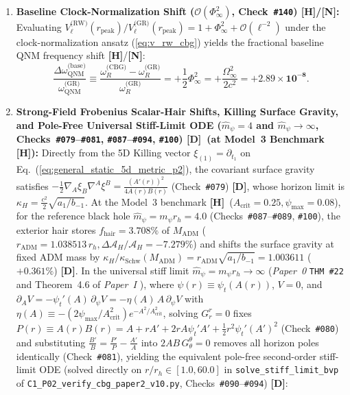 \documentclass[11pt,a4paper]{article}
\newcommand{\catD}{\textbf{\textcolor{blue!75!black}{[D]}}}
\newcommand{\catH}{\textbf{\textcolor{orange!85!black}{[H]}}}
\newcommand{\catN}{\textbf{\textcolor{teal!75!black}{[N]}}}
\theoremstyle{plain}
\theoremstyle{definition}
\theoremstyle{remark}
\numberwithin{equation}{section}
\begin{document}
\begin{enumerate}
    \item \textbf{Baseline Clock-Normalization Shift ($\mathcal{O}(\Phi_{\infty}^2)$, Check~\texttt{\#140}) \catH/\catN:} Evaluating $V_{\ell}^{\text{(RW)}}(r_{\text{peak}})/V_{\ell}^{\text{(GR)}}(r_{\text{peak}}) = 1 + \Phi_{\infty}^2 + \mathcal{O}(\ell^{-2})$ under the clock-normalization ansatz (\ref{eq:v_rw_cbg}) yields the fractional baseline QNM frequency shift \catH/\catN:
    \begin{equation}
    \frac{\Delta \omega_{\text{QNM}}^{\text{(base)}}}{\omega_{\text{QNM}}^{\text{(GR)}}} \equiv \frac{\omega_{R}^{\text{(CBG)}} - \omega_{R}^{\text{(GR)}}}{\omega_{R}^{\text{(GR)}}} = +\frac{1}{2}\Phi_{\infty}^2 = +\frac{\Omega_{\infty}^2}{2 c^2} = \mathbf{+2.89 \times 10^{-8}}.
    \label{eq:universal_qnm_shift}
    \end{equation}
    \item \textbf{Strong-Field Frobenius Scalar-Hair Shifts, Killing Surface Gravity, and Pole-Free Universal Stiff-Limit ODE ($\hat{m}_{\psi} = 4$ and $\hat{m}_{\psi} \to \infty$, Checks~\texttt{\#079}--\texttt{\#081}, \texttt{\#087}--\texttt{\#094}, \texttt{\#100}) \catD\ (at Model~3 Benchmark \catH):} Directly from the 5D Killing vector $\xi_{(1)} = \partial_{t_1}$ on Eq.~(\ref{eq:general_static_5d_metric_p2}), the covariant surface gravity satisfies $-\frac{1}{2}\nabla_A\xi_B\nabla^A\xi^B = \frac{(A'(r))^2}{4 A(r)B(r)}$ (Check~\texttt{\#079}) \catD, whose horizon limit is $\kappa_H = \frac{c^2}{2}\sqrt{a_1/b_{-1}}$. At the Model~3 benchmark \catH\ ($A_{\text{crit}} = 0.25, \psi_{\max} = 0.08$), for the reference black hole $\hat{m}_{\psi} = m_{\psi} r_h = 4.0$ (Checks~\texttt{\#087}--\texttt{\#089}, \texttt{\#100}), the exterior hair stores $f_{\text{hair}} = 3.708\%$ of $M_{\text{ADM}}$ ($r_{\text{ADM}} = 1.038513\,r_h, \Delta\mathcal{A}_H/\mathcal{A}_H = -7.279\%$) and shifts the surface gravity at fixed ADM mass by $\kappa_H/\kappa_{\text{Schw}}(M_{\text{ADM}}) = r_{\text{ADM}}\sqrt{a_1/b_{-1}} = \mathbf{1.003611}$ ($+0.361\%$) \catD. In the universal stiff limit $\hat{m}_{\psi} = m_{\psi}r_h \to \infty$ (\textit{Paper~0} \texttt{THM~\#22} \cite{jimenez2026_p0} and Theorem~4.6 of \textit{Paper~I} \cite{jimenez2026a}), where $\psi(r) \equiv \psi_t(A(r))$, $V = 0$, and $\partial_A V = -\psi_t'(A)\,\partial_{\psi}V = -\eta(A)\,A\,\partial_{\psi}V$ with $\eta(A) \equiv -(2\psi_{\max}/A_{\text{crit}}^2)e^{-A^2/A_{\text{crit}}^2}$, solving $G^r_r = 0$ fixes $P(r) \equiv A(r)B(r) = A + r A' + 2 r A\psi_t' A' + \frac{1}{2}r^2\psi_t'(A')^2$ (Check~\texttt{\#080}) and substituting $\frac{B'}{B} = \frac{P'}{P} - \frac{A'}{A}$ into $2 A B\,G^{\theta}_{\theta} = 0$ removes all horizon poles identically (Check~\texttt{\#081}), yielding the equivalent pole-free second-order stiff-limit ODE (solved directly on $r/r_h \in [1.0, 60.0]$ in \texttt{solve\_stiff\_limit\_bvp} of \allowbreak\texttt{C1\_P02\_verify\_cbg\_paper2\_v10.py}, Checks~\texttt{\#090}--\texttt{\#094}) \catD:

\end{enumerate}
\end{document}
